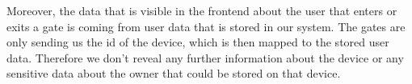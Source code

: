 Moreover, the data that is visible in the frontend about the user that enters or exits a gate is coming from user data that is stored in our system. The gates are only sending us the id of the device, which is then mapped to the stored user data. Therefore we don't reveal any further information about the device or any sensitive data about the owner that could be stored on that device.

\clearpage